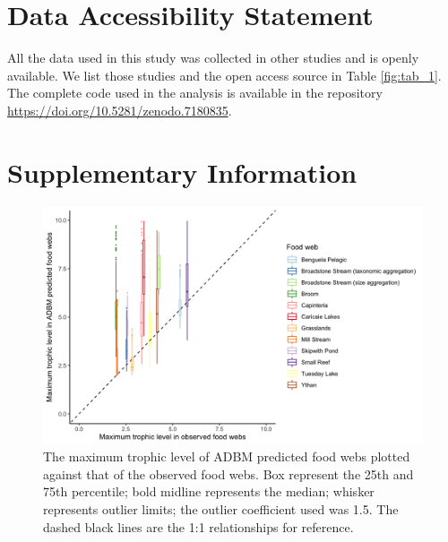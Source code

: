 \documentclass{article}
\begin{document}
\hypertarget{data-accessibility-statement}{%
\section{Data Accessibility
Statement}\label{data-accessibility-statement}}

All the data used in this study was collected in other studies and is
openly available. We list those studies and the open access source in
Table \ref{fig:tab_1}. The complete code used in the analysis is
available in the repository
\url{https://doi.org/10.5281/zenodo.7180835}.

\hypertarget{supplementary-information}{%
\section{Supplementary Information}\label{supplementary-information}}

\begin{figure}[H]

{\centering \includegraphics[width=450px]{../results/plot_max_tl_ADBM_vs_emp} 

}

\caption{\label{fig:fig_a1} The maximum trophic level of ADBM predicted food webs plotted against that of the observed food webs. Box represent the 25th and 75th percentile; bold midline represents the median; whisker represents outlier limits; the outlier coefficient used was 1.5. The dashed black lines are the 1:1 relationships for reference.}\label{fig:unnamed-chunk-4}
\end{figure}
\end{document}
